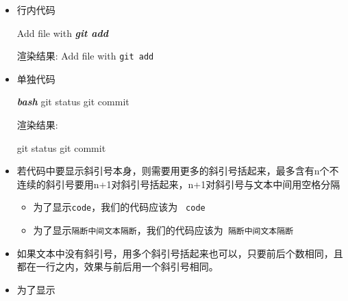 \documentclass[]{ctexbook}
\newenvironment{Shaded}{\begin{snugshade}}{\end{snugshade}}
\newcommand{\FunctionTok}[1]{\textcolor[rgb]{0.00,0.00,0.00}{#1}}
\newcommand{\InformationTok}[1]{\textcolor[rgb]{0.56,0.35,0.01}{\textbf{\textit{#1}}}}
\newcommand{\NormalTok}[1]{#1}
\providecommand{\tightlist}{%
  \setlength{\itemsep}{0pt}\setlength{\parskip}{0pt}}
\begin{document}
\begin{itemize}
\item
  行内代码

\begin{Shaded}
\begin{Highlighting}[]
\NormalTok{Add file with }\InformationTok{\textasciigrave{}git add\textasciigrave{}}
\end{Highlighting}
\end{Shaded}

  渲染结果:
  Add file with \texttt{git\ add}
\item
  单独代码

\begin{Shaded}
\begin{Highlighting}[]
\InformationTok{\textasciigrave{}\textasciigrave{}\textasciigrave{}bash}
\FunctionTok{git}\NormalTok{ status}
\FunctionTok{git}\NormalTok{ commit}
\InformationTok{\textasciigrave{}\textasciigrave{}\textasciigrave{}}
\end{Highlighting}
\end{Shaded}

  渲染结果:

\begin{Shaded}
\begin{Highlighting}[]
\FunctionTok{git}\NormalTok{ status}
\FunctionTok{git}\NormalTok{ commit}
\end{Highlighting}
\end{Shaded}
\item
  若代码中要显示斜引号本身，则需要用更多的斜引号括起来，最多含有n个不连续的斜引号要用n+1对斜引号括起来，n+1对斜引号与文本中间用空格分隔

  \begin{itemize}
  \tightlist
  \item
    为了显示\texttt{\textasciigrave{}\textasciigrave{}\textasciigrave{}code\textasciigrave{}\textasciigrave{}\textasciigrave{}}，我们的代码应该为 \texttt{\textasciigrave{}\textasciigrave{}\textasciigrave{}\textasciigrave{}\ \textasciigrave{}\textasciigrave{}\textasciigrave{}code\textasciigrave{}\textasciigrave{}\textasciigrave{}\ \textasciigrave{}\textasciigrave{}\textasciigrave{}\textasciigrave{}}
  \item
    为了显示\texttt{\textasciigrave{}隔断\textasciigrave{}\textasciigrave{}中间文本\textasciigrave{}\textasciigrave{}隔断\textasciigrave{}}，我们的代码应该为\texttt{\textasciigrave{}\textasciigrave{}\textasciigrave{}\ \textasciigrave{}隔断\textasciigrave{}\textasciigrave{}中间文本\textasciigrave{}\textasciigrave{}隔断\textasciigrave{}\ \textasciigrave{}\textasciigrave{}\textasciigrave{}}
  \end{itemize}
\item
  如果文本中没有斜引号，用多个斜引号括起来也可以，只要前后个数相同，且都在一行之内，效果与前后用一个斜引号相同。
\item
  为了显示
\end{itemize}
\end{document}
